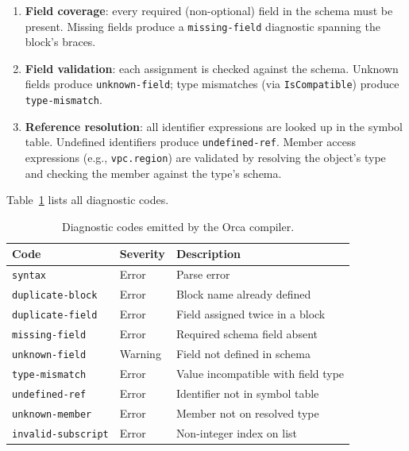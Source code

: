 \documentclass[sigconf,nonacm]{acmart}
\begin{document}
\begin{enumerate}[leftmargin=*]
  \item \textbf{Field coverage}: every required (non-optional) field in the
        schema must be present. Missing fields produce a
        \texttt{missing-field} diagnostic spanning the block's braces.
  \item \textbf{Field validation}: each assignment is checked against the
        schema. Unknown fields produce \texttt{unknown-field}; type
        mismatches (via \texttt{IsCompatible}) produce \texttt{type-mismatch}.
  \item \textbf{Reference resolution}: all identifier expressions are
        looked up in the symbol table. Undefined identifiers produce
        \texttt{undefined-ref}. Member access expressions (e.g.,
        \texttt{vpc.region}) are validated by resolving the object's type
        and checking the member against the type's schema.
\end{enumerate}

Table~\ref{tab:diagnostics} lists all diagnostic codes.

\begin{table}[t]
\caption{Diagnostic codes emitted by the Orca compiler.}
\label{tab:diagnostics}
\centering
\small
\begin{tabular}{@{}lll@{}}
\toprule
\textbf{Code} & \textbf{Severity} & \textbf{Description} \\
\midrule
\texttt{syntax}            & Error   & Parse error \\
\texttt{duplicate-block}   & Error   & Block name already defined \\
\texttt{duplicate-field}   & Error   & Field assigned twice in a block \\
\texttt{missing-field}     & Error   & Required schema field absent \\
\texttt{unknown-field}     & Warning & Field not defined in schema \\
\texttt{type-mismatch}     & Error   & Value incompatible with field type \\
\texttt{undefined-ref}     & Error   & Identifier not in symbol table \\
\texttt{unknown-member}    & Error   & Member not on resolved type \\
\texttt{invalid-subscript} & Error   & Non-integer index on list \\
\bottomrule
\end{tabular}
\end{table}
\end{document}
